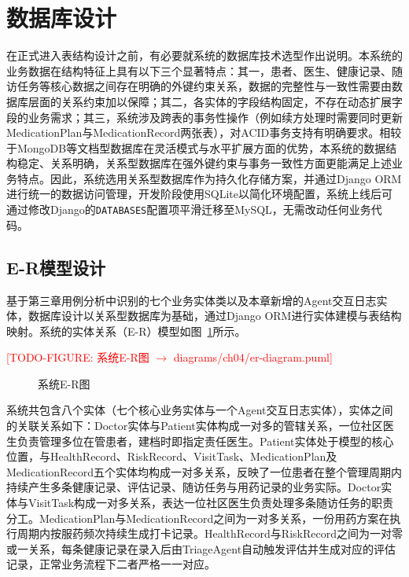 \section{数据库设计}

在正式进入表结构设计之前，有必要就系统的数据库技术选型作出说明。本系统的业务数据在结构特征上具有以下三个显著特点：其一，患者、医生、健康记录、随访任务等核心数据之间存在明确的外键约束关系，数据的完整性与一致性需要由数据库层面的关系约束加以保障；其二，各实体的字段结构固定，不存在动态扩展字段的业务需求；其三，系统涉及跨表的事务性操作（例如续方处理时需要同时更新MedicationPlan与MedicationRecord两张表），对ACID事务支持有明确要求。相较于MongoDB等文档型数据库在灵活模式与水平扩展方面的优势，本系统的数据结构稳定、关系明确，关系型数据库在强外键约束与事务一致性方面更能满足上述业务特点。因此，系统选用关系型数据库作为持久化存储方案，并通过Django ORM进行统一的数据访问管理，开发阶段使用SQLite以简化环境配置，系统上线后可通过修改Django的\texttt{DATABASES}配置项平滑迁移至MySQL，无需改动任何业务代码。


\subsection{E-R模型设计}

基于第三章用例分析中识别的七个业务实体类以及本章新增的Agent交互日志实体，数据库设计以关系型数据库为基础，通过Django ORM进行实体建模与表结构映射。系统的实体关系（E-R）模型如图~\ref{fig:er-diagram}所示。

\todofig{}
\textcolor{red}{[TODO-FIGURE: 系统E-R图 $\rightarrow$ diagrams/ch04/er-diagram.puml]}
\begin{figure}[H]
\centering
\caption{系统E-R图}
\label{fig:er-diagram}
\end{figure}

系统共包含八个实体（七个核心业务实体与一个Agent交互日志实体），实体之间的关联关系如下：Doctor实体与Patient实体构成一对多的管辖关系，一位社区医生负责管理多位在管患者，建档时即指定责任医生。Patient实体处于模型的核心位置，与HealthRecord、RiskRecord、VisitTask、MedicationPlan及MedicationRecord五个实体均构成一对多关系，反映了一位患者在整个管理周期内持续产生多条健康记录、评估记录、随访任务与用药记录的业务实际。Doctor实体与VisitTask构成一对多关系，表达一位社区医生负责处理多条随访任务的职责分工。MedicationPlan与MedicationRecord之间为一对多关系，一份用药方案在执行周期内按服药频次持续生成打卡记录。HealthRecord与RiskRecord之间为一对零或一关系，每条健康记录在录入后由TriageAgent自动触发评估并生成对应的评估记录，正常业务流程下二者严格一一对应。


